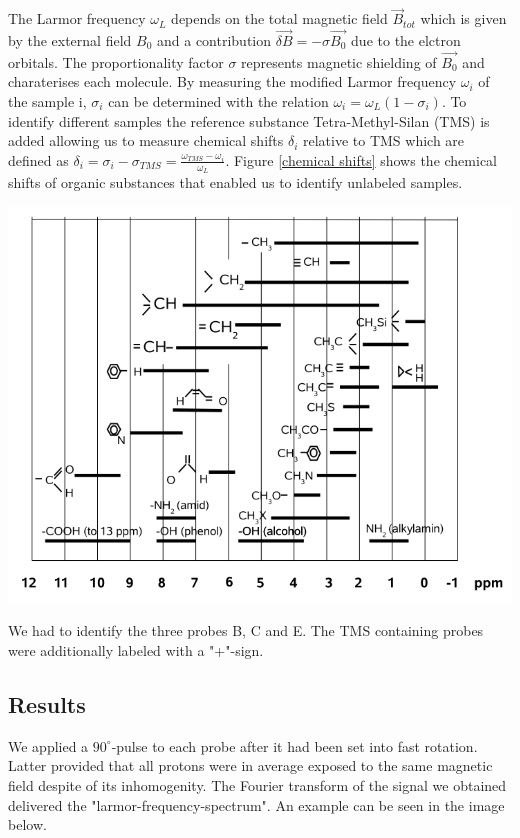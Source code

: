\documentclass[12pt, english]{scrartcl} %
\begin{document}
\begin{multicols}{2}
The Larmor frequency $\omega_L$ depends on the total magnetic field $\vec{B}_{tot}$ which is given by the external field $B_0$ and a contribution $\vec{\delta B} = - \sigma \vec{B_0}$ due to the elctron orbitals. The proportionality factor $\sigma$ represents magnetic shielding of $\vec{B_0}$ and charaterises each molecule. By measuring the modified Larmor frequency $\omega_i$ of the sample i, $\sigma_i$ can be determined with the relation $\omega_i = \omega_L (1- \sigma_i)$. To identify different samples the reference substance Tetra-Methyl-Silan (TMS) is added allowing us to measure chemical shifts $\delta_i$ relative to TMS which are defined as $\delta_i = \sigma_i - \sigma_{TMS} = \frac{ \omega_{TMS} - \omega_i }{ \omega_L }$.
Figure \ref{chemical shifts} shows the chemical shifts of organic substances that enabled us to identify unlabeled samples.

\begin{center}
\includegraphics[width=\columnwidth]{graphics/chemical_shifts.png}
\label{chemical shifts}
\end{center}

We had to identify the three probes B, C and E. The TMS containing probes were additionally labeled with a "+"-sign.

\subsection{Results}

 We applied a $90^\circ$-pulse to each probe after it had been set into fast rotation. Latter provided that all protons were in average exposed to the same magnetic field despite of its inhomogenity. The Fourier transform of the signal we obtained delivered the "larmor-frequency-spectrum". An example can be seen in the image below.
 

\end{multicols}
\end{document}
